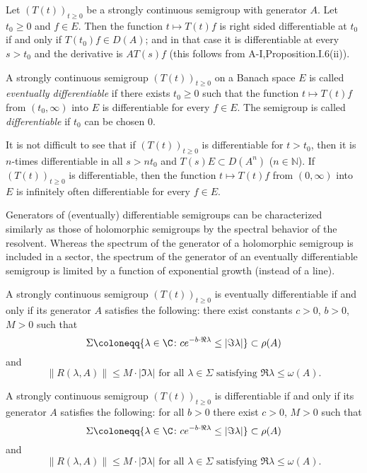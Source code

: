 Let $(T(t))_{t\geq 0}$ be a strongly continuous semigroup with generator $A$.
Let $t_0 \geq 0$ and $f \in E$.
Then the function $t \mapsto T(t)f$ is right sided differentiable at $t_0$ if and only if $T(t_0)f \in D(A)$; and in that case it is differentiable at every $s > t_0$ and the derivative is $AT(s)f$ (this follows from A-I,Proposition.I.6(ii)).

\begin{definition}\label{def:a2-1.16}
A strongly continuous semigroup $(T(t))_{t \geq 0}$ on a Banach space $E$ is called \emph{eventually differentiable} if there exists $t_0 \geq 0$ such that the function $t \mapsto T(t)f$ from $(t_0,\infty)$ into $E$ is differentiable for every $f \in E$.
The semigroup is called \emph{differentiable} if $t_0$ can be chosen $0$.
\end{definition}

It is not difficult to see that if $(T(t))_{t \geq 0}$ is differentiable for $t > t_{0}$, then it is $n$-times differentiable in all $s > nt_{0}$ and $T(s)E \subset D(A^n)$ ($n \in \mathbb{N}$).
If $(T(t))_{t\geq 0}$ is differentiable, then the function $t \mapsto T(t)f$ from $(0,\infty)$ into $E$ is infinitely often differentiable for every $f \in E$.

Generators of (eventually) differentiable semigroups can be characterized similarly as those of holomorphic semigroups by the spectral behavior of the resolvent.
Whereas the spectrum of the generator of a holomorphic semigroup is included in a sector, the spectrum of the generator of an eventually differentiable semigroup is limited by a function of exponential growth (instead of a line).
\begin{theorem}\label{thm:a2-1.17}
A strongly continuous semigroup $(T(t))_{t\geq 0}$ is eventually differentiable if and only if its generator $A$ satisfies the following: there exist constants $c>0$, $b>0$, $M>0$ such that
\[
    \Sigma \coloneqq \{\lambda \in \C \colon ce^{-b\cdot \Re\lambda} \leq |\Im\lambda|\} \subset \rho(A)
\]
and
\[
    \|R(\lambda,A)\| \leq M\cdot|\Im\lambda| \text{ for all } \lambda \in \Sigma \text{ satisfying } \Re\lambda \leq \omega(A).
\]
\end{theorem}

\begin{theorem}\label{thm:a2-1.18}
A strongly continuous semigroup $(T(t))_{t\geq 0}$ is differentiable if and only if its generator $A$ satisfies the following: for all $b>0$ there exist $c>0$, $M>0$ such that
\[
    \Sigma \coloneqq \{\lambda \in \C \colon ce^{-b\cdot \Re\lambda} \leq |\Im\lambda|\} \subset \rho(A)
\]
and
\[
    \|R(\lambda,A)\| \leq M\cdot|\Im\lambda| \text{ for all } \lambda \in \Sigma \text{ satisfying } \Re\lambda \leq \omega(A).
\]
\end{theorem}

